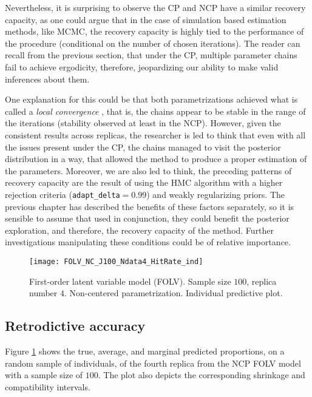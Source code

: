Nevertheless, it is surprising to observe the CP and NCP have a similar recovery capacity, as one could argue that in the case of simulation based estimation methods, like MCMC, the recovery capacity is highly tied to the performance of the procedure (conditional on the number of chosen iterations). The reader can recall from the previous section, that under the CP, multiple parameter chains fail to achieve ergodicity, therefore, jeopardizing our ability to make valid inferences about them. 

One explanation for this could be that both parametrizations achieved what is called a \textit{local convergence} \cite{Depaoli_2021}, that is, the chains appear to be stable in the range of the iterations (stability observed at least in the NCP). However, given the consistent results across replicas, the researcher is led to think that even with all the issues present under the CP, the chains managed to visit the posterior distribution in a way, that allowed the method to produce a proper estimation of the parameters. Moreover, we are also led to think, the preceding patterns of recovery capacity are the result of using the HMC algorithm with a higher rejection criteria (\texttt{adapt\_delta}$=0.99$) and weakly regularizing priors. The previous chapter has described the benefits of these factors separately, so it is sensible to assume that used in conjunction, they could benefit the posterior exploration, and therefore, the recovery capacity of the method. Further investigations manipulating these conditions could be of relative importance.


%
\begin{figure}[H]
	\centering
	\texttt{[image: FOLV\_NC\_J100\_Ndata4\_HitRate\_ind]}
	\caption[First-order latent variable model (FOLV). Sample size $100$, replica number $4$. Non-centered parametrization. Individual predictive plot.]%
	{First-order latent variable model (FOLV). Sample size $100$, replica number $4$. Non-centered parametrization. Individual predictive plot.}
	\label{fig:FOLV_NC_hitrate_ind}
\end{figure}

\subsection{Retrodictive accuracy} \label{sub_sect:retrodictive_simulation}

Figure \ref{fig:FOLV_NC_hitrate_ind} shows the true, average, and marginal predicted proportions, on a random sample of individuals, of the fourth replica from the NCP FOLV model with a sample size of $100$. The plot also depicts the corresponding shrinkage and compatibility intervals. 

